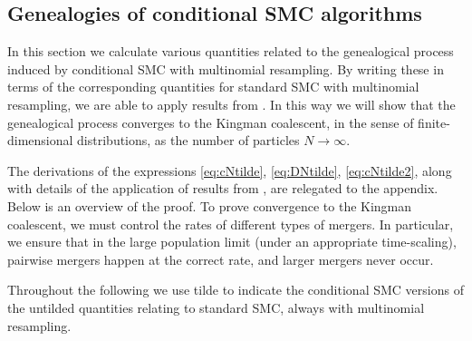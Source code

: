 \documentclass[fleqn]{article}
\begin{document}
\subsection{Genealogies of conditional SMC algorithms}
In this section we calculate various quantities related to the genealogical process induced by conditional SMC with multinomial resampling. By writing these in terms of the corresponding quantities for standard SMC with multinomial resampling, we are able to apply results from \citet{koskela2018}. In this way we will show that the genealogical process converges to the Kingman coalescent, in the sense of finite-dimensional distributions, as the number of particles $N\to\infty$.

The derivations of the expressions \eqref{eq:cNtilde}, \eqref{eq:DNtilde}, \eqref{eq:cNtilde2}, along with details of the application of results from \citet{koskela2018}, are relegated to the appendix. Below is an overview of the proof.
To prove convergence to the Kingman coalescent, we must control the rates of different types of mergers. In particular, we ensure that in the large population limit (under an appropriate time-scaling), pairwise mergers happen at the correct rate, and larger mergers never occur.

Throughout the following we use tilde to indicate the conditional SMC versions of the untilded quantities relating to standard SMC, always with multinomial resampling.
\end{document}
